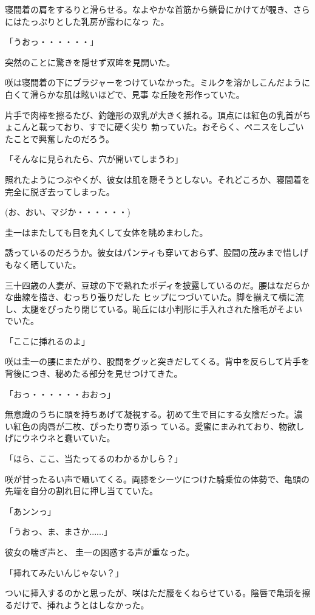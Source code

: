 ﻿\documentclass[book,tate]{jlreq}
\begin{document}
寝間着の肩をするりと滑らせる。なよやかな首筋から鎖骨にかけてが覗き、さらにはたっぷりとした乳房が露わになっ た。

「うおっ・・・・・・」

突然のことに驚きを隠せず双眸を見開いた。

咲は寝間着の下にブラジャーをつけていなかった。ミルクを溶かしこんだように白くて滑らかな肌は眩いほどで、見事 な丘陵を形作っていた。

片手で肉棒を擦るたび、釣鐘形の双乳が大きく揺れる。頂点には紅色の乳首がちょこんと載っており、すでに硬く尖り 勃っていた。おそらく、ペニスをしごいたことで興奮したのだろう。

「そんなに見られたら、穴が開いてしまうわ」

照れたようにつぶやくが、彼女は肌を隠そうとしない。それどころか、寝間着を完全に脱ぎ去ってしまった。

(お、おい、マジか・・・・・・)

圭一はまたしても目を丸くして女体を眺めまわした。

誘っているのだろうか。彼女はパンティも穿いておらず、股間の茂みまで惜しげもなく晒していた。

三十四歳の人妻が、豆球の下で熟れたボディを披露しているのだ。腰はなだらかな曲線を描き、むっちり張りだした ヒップにつづいていた。脚を揃えて横に流し、太腿をぴったり閉じている。恥丘には小判形に手入れされた陰毛がそよい でいた。

「ここに挿れるのよ」

咲は圭一の腰にまたがり、股間をグッと突きだしてくる。背中を反らして片手を背後につき、秘めたる部分を見せつけてきた。

「おっ・・・・・・おおっ」

無意識のうちに頭を持ちあげて凝視する。初めて生で目にする女陰だった。濃い紅色の肉唇が二枚、ぴったり寄り添っ ている。愛蜜にまみれており、物欲しげにウネウネと蠢いていた。

「ほら、ここ、当たってるのわかるかしら？」

咲が甘ったるい声で囁いてくる。両膝をシーツにつけた騎乗位の体勢で、亀頭の先端を自分の割れ目に押し当てていた。

「あンンっ」

「うおっ、ま、まさか......」

彼女の喘ぎ声と、 圭一の困惑する声が重なった。

「挿れてみたいんじゃない？」

ついに挿入するのかと思ったが、咲はただ腰をくねらせている。陰唇で亀頭を擦るだけで、挿れようとはしなかった。
\end{document}
